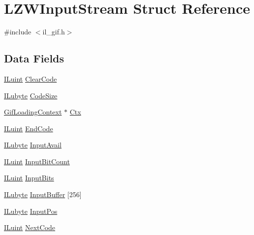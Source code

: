 \hypertarget{struct_l_z_w_input_stream}{\section{L\-Z\-W\-Input\-Stream Struct Reference}
\label{struct_l_z_w_input_stream}
}


{\ttfamily \#include $<$il\-\_\-gif.\-h$>$}

\subsection*{Data Fields}
\begin{DoxyCompactItemize}
\item 
\hyperlink{il_8h_ac6508d0e9c19e32f32e00d54b5b8cf30}{I\-Luint} \hyperlink{struct_l_z_w_input_stream_a1c50a29bd9d82e3370efa228edf392f8}{Clear\-Code}
\item 
\hyperlink{il_8h_a8d2f04500100a86d1b00e98ab1b15a33}{I\-Lubyte} \hyperlink{struct_l_z_w_input_stream_a5127cc339955e2ef9f5ff9a614ec4fe6}{Code\-Size}
\item 
\hyperlink{struct_gif_loading_context}{Gif\-Loading\-Context} $\ast$ \hyperlink{struct_l_z_w_input_stream_a69730c8c6f14a00957b50e0c556c9177}{Ctx}
\item 
\hyperlink{il_8h_ac6508d0e9c19e32f32e00d54b5b8cf30}{I\-Luint} \hyperlink{struct_l_z_w_input_stream_aac40a6e3cf3ee104d577911433a8665d}{End\-Code}
\item 
\hyperlink{il_8h_a8d2f04500100a86d1b00e98ab1b15a33}{I\-Lubyte} \hyperlink{struct_l_z_w_input_stream_a99ae6f9e4de35f88f607bf60745ec9fe}{Input\-Avail}
\item 
\hyperlink{il_8h_ac6508d0e9c19e32f32e00d54b5b8cf30}{I\-Luint} \hyperlink{struct_l_z_w_input_stream_a7ca090ba742efca971f20234d7bc9e61}{Input\-Bit\-Count}
\item 
\hyperlink{il_8h_ac6508d0e9c19e32f32e00d54b5b8cf30}{I\-Luint} \hyperlink{struct_l_z_w_input_stream_a84a5471b2c74c92549170692040e0fca}{Input\-Bits}
\item 
\hyperlink{il_8h_a8d2f04500100a86d1b00e98ab1b15a33}{I\-Lubyte} \hyperlink{struct_l_z_w_input_stream_a06c7cbb03d953aaca50923be0fecbf3d}{Input\-Buffer} \mbox{[}256\mbox{]}
\item 
\hyperlink{il_8h_a8d2f04500100a86d1b00e98ab1b15a33}{I\-Lubyte} \hyperlink{struct_l_z_w_input_stream_a283a030a748b125c0b6d252db657f0be}{Input\-Pos}
\item 
\hyperlink{il_8h_ac6508d0e9c19e32f32e00d54b5b8cf30}{I\-Luint} \hyperlink{struct_l_z_w_input_stream_a3fbdcdb77e1908a75136ad1e72a6de4d}{Next\-Code}

\end{DoxyCompactItemize}
